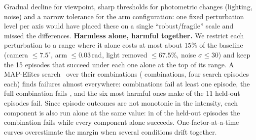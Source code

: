 Gradual decline for viewpoint, sharp thresholds for photometric changes (lighting, noise) and a narrow
tolerance for the arm configuration: one fixed perturbation level per axis would have placed these on a
single ``robust/fragile'' scale and missed the differences.
\textbf{Harmless alone, harmful together.} We restrict each perturbation to a range where it alone costs at
most about 15\% of the baseline (camera $\le7.5^\circ$, arm $\le0.03$\,rad, light removed $\le67.5\%$,
noise $\sigma\le30$) and keep the 15 episodes that succeed under each one alone at the top of its range. A
MAP-Elites search~\citep{mouret2015mapelites} over their combinations (\QDEvals{} combinations, four search
episodes each) finds failures almost everywhere: \QDAnyFail{} combinations fail at least one episode, the
full combination fails \QDCornerFails{}, and the six most harmful ones make \QDValPooled{} of the 11 held-out
episodes fail. Since episode outcomes are not monotonic in the intensity, each component is also run alone at
the same value: in \QDPure{} of the held-out episodes the combination fails while every component alone
succeeds. One-factor-at-a-time curves overestimate the margin when several conditions drift together.



